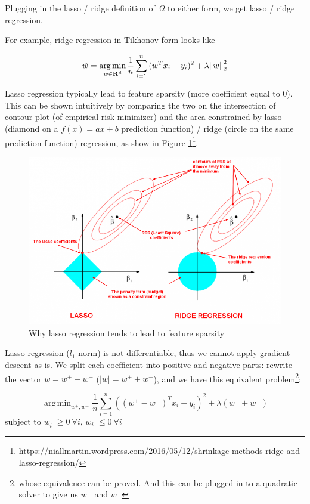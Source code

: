 \documentclass{article}
\DeclareMathOperator*{\argmin}{arg\,min}
\begin{document}
Plugging in the lasso / ridge definition of $\Omega$ to either form, we get lasso / ridge regression.

For example, ridge regression in Tikhonov form looks like

$$
\hat{w} = \argmin_{w \in \mathbf{R}^{d}}{\frac{1}{n} \sum_{i = 1}^{n}{(w^{T} x_i - y_i)^2} + \lambda \norm{w}_2^2}
$$

Lasso regression typically lead to feature sparsity (more coefficient equal to $0$).
This can be shown intuitively by comparing the two on the intersection of contour plot (of empirical risk minimizer) and the area constrained by lasso (diamond on a $f(x) = ax + b$ prediction function) / ridge (circle on the same prediction function) regression, as show in Figure \ref{lasso-vs-ridge-sparsity}\footnote{https://niallmartin.wordpress.com/2016/05/12/shrinkage-methods-ridge-and-lasso-regression/}.

\begin{figure}[h]
\centering
\includegraphics[scale=0.3]{res/lasso_vs_ridge_regression.png}
\caption{Why lasso regression tends to lead to feature sparsity}
\label{lasso-vs-ridge-sparsity}
\end{figure}

Lasso regression ($\mathit{l}_1$-norm) is not differentiable, thus we cannot apply gradient descent as-is.
We split each coefficient into positive and negative parts: rewrite the vector $w = w^{+} - w^{-}$ ($|w| = w^{+} + w^{-}$), and we have this equivalent problem\footnote{whose equivalence can be proved. And this can be plugged in to a quadratic solver to give us $w^{+}$ and $w^{-}$}:

$$
\argmin_{w^{+}, w^{-}}{\frac{1}{n} \sum_{i = 1}^{n}{((w^{+} - w^{-})^{T} x_i - y_i)^2} + \lambda (w^{+} + w^{-})}
$$
subject to $w_i^{+} \geq 0 ~ \forall i$, $w_i^{-} \leq 0 ~ \forall i$
\end{document}
